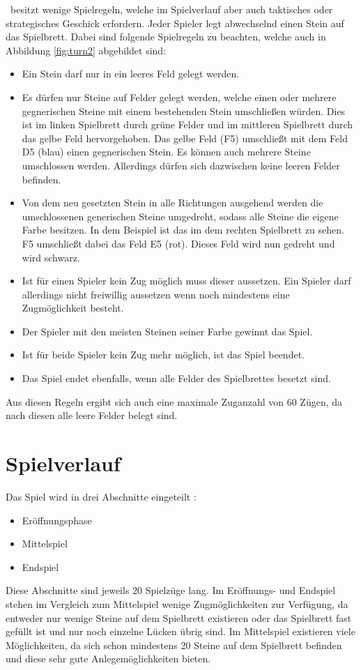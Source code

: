 \ot\ besitzt wenige Spielregeln, welche im Spielverlauf aber auch taktisches oder strategisches Geschick erfordern. Jeder Spieler legt abwechselnd einen Stein auf das Spielbrett. Dabei sind folgende Spielregeln zu beachten, welche auch in Abbildung \ref{fig:turn2} abgebildet sind:
\begin{itemize}
\item Ein Stein darf nur in ein leeres Feld gelegt werden.
\item Es dürfen nur Steine auf Felder gelegt werden, welche einen oder mehrere gegnerischen Steine mit einem bestehenden Stein umschließen würden. Dies ist im linken Spielbrett durch grüne Felder und im mittleren Spielbrett durch das gelbe Feld hervorgehoben. Das gelbe Feld (F5) umschließt mit dem Feld D5 (blau) einen gegnerischen Stein. Es können auch mehrere Steine umschlossen werden. Allerdings dürfen sich dazwischen keine leeren Felder befinden.
\item Von dem neu gesetzten Stein in alle Richtungen ausgehend werden die umschlossenen generischen Steine umgedreht, sodass alle Steine die eigene Farbe besitzen. In dem Beispiel ist das im dem rechten Spielbrett zu sehen. F5 umschließt dabei das Feld E5 (rot). Dieses Feld wird nun gedreht und wird schwarz.
\item Ist für einen Spieler kein Zug möglich muss dieser aussetzen. Ein Spieler darf allerdings nicht freiwillig aussetzen wenn noch mindestens eine Zugmöglichkeit besteht.
\item Der Spieler mit den meisten Steinen seiner Farbe gewinnt das Spiel.
\item Ist für beide Spieler kein Zug mehr möglich, ist das Spiel beendet. 
\item Das Spiel endet ebenfalls, wenn alle Felder des Spielbrettes besetzt sind.
\end{itemize}
Aus diesen Regeln ergibt sich auch eine maximale Zuganzahl von 60 Zügen, da nach diesen alle leere Felder belegt sind.
\newpage
\section{Spielverlauf}
Das Spiel wird in drei Abschnitte eingeteilt \cite{Ortiz.}:
\begin{itemize}
\item Eröffnungsphase
\item Mittelspiel
\item Endspiel
\end{itemize}
Diese Abschnitte sind jeweils 20 Spielzüge lang.
Im Eröffnungs- und Endspiel stehen im Vergleich zum Mittelspiel wenige Zugmöglichkeiten zur Verfügung, da entweder nur wenige Steine auf dem Spielbrett existieren oder das Spielbrett fast gefüllt ist und nur noch einzelne Lücken übrig sind. Im Mittelspiel existieren viele Möglichkeiten, da sich schon mindestens 20 Steine auf dem Spielbrett befinden und diese sehr gute Anlegemöglichkeiten bieten. 
